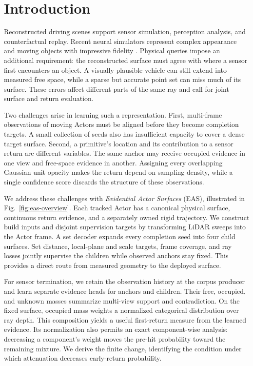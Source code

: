 \section{Introduction}

Reconstructed driving scenes support sensor simulation, perception analysis, and counterfactual replay.
Recent neural simulators represent complex appearance and moving objects with impressive fidelity
\cite{yang2023unisim,zheng2024lidar4d,wu2024dynfl}. Physical queries impose an additional requirement:
the reconstructed surface must agree with where a sensor first encounters an object.
A visually plausible vehicle can still extend into measured free space, while a sparse but accurate point set
can miss much of its surface. These errors affect different parts of the same ray and call for joint surface
and return evaluation.

Two challenges arise in learning such a representation. First, multi-frame observations of moving Actors must
be aligned before they become completion targets. A small collection of seeds also has insufficient capacity
to cover a dense target surface. Second, a primitive's location and its contribution to a sensor return are
different variables. The same anchor may receive occupied evidence in one view and free-space evidence in another.
Assigning every overlapping Gaussian unit opacity makes the return depend on sampling density, while a single
confidence score discards the structure of these observations.

We address these challenges with \emph{Evidential Actor Surfaces} (EAS), illustrated in
Fig.~\ref{fig:eas-overview}. Each tracked Actor has a canonical physical surface, continuous return evidence,
and a separately owned rigid trajectory. We construct build inputs and disjoint supervision targets by
transforming LiDAR sweeps into the Actor frame. A set decoder expands every completion seed into four child
surfaces. Set distance, local-plane and scale targets, frame coverage, and ray losses jointly supervise the
children while observed anchors stay fixed. This provides a direct route from measured geometry to the deployed surface.

For sensor termination, we retain the observation history at the corpus producer and learn separate evidence
heads for anchors and children. Their free, occupied, and unknown masses summarize multi-view support and
contradiction. On the fixed surface, occupied mass weights a normalized categorical distribution over ray depth.
This composition yields a useful first-return measure from the learned evidence. Its normalization also permits
an exact component-wise analysis: decreasing a component's weight moves the pre-hit probability toward the
remaining mixture. We derive the finite change, identifying the condition under which attenuation decreases
early-return probability.

